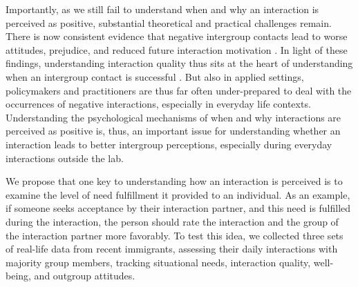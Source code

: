 \documentclass[man, 12pt, a4paper, mask]{apa7}
\theoremstyle{break}
\theoremstyle{plain}
\begin{document}
Importantly, as we still fail to understand when and why an interaction is perceived as positive, substantial theoretical and practical challenges remain. There is now consistent evidence that negative intergroup contacts lead to worse attitudes, prejudice, and reduced future interaction motivation \citep[e.g.,][]{Barlow2012, Prati2021, Graf2014}. In light of these findings, understanding interaction quality thus sits at the heart of understanding when an intergroup contact is successful \citep[e.g.,][]{Allport1954b, Brown2007, Tropp2016}. But also in applied settings, policymakers and practitioners are thus far often under-prepared to deal with the occurrences of negative interactions, especially in everyday life contexts. Understanding the psychological mechanisms of when and why interactions are perceived as positive is, thus, an important issue for understanding whether an interaction leads to better intergroup perceptions, especially during everyday interactions outside the lab.

We propose that one key to understanding how an interaction is perceived is to examine the level of need fulfillment it provided to an individual. As an example, if someone seeks acceptance by their interaction partner, and this need is fulfilled during the interaction, the person should rate the interaction and the group of the interaction partner more favorably. To test this idea, we collected three sets of real-life data from recent immigrants, assessing their daily interactions with majority group members, tracking situational needs, interaction quality, well-being, and outgroup attitudes. 
\end{document}
